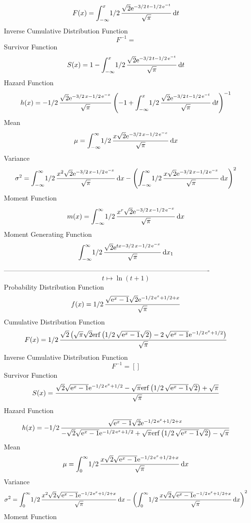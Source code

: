 \documentclass[12pt]{article}
\begin{document}
 $$F(x)=\int_{-\infty }^{x}\!1/2\,{\frac {\sqrt {2}{{\rm e}^{-3/2\,t-1/2\,{
{\rm e}^{-t}}}}}{\sqrt {\pi}}}\,{\rm d}t
$$ Inverse Cumulative Distribution Function 
  $$F^{-1} = $$Survivor Function 
 $$ S(x)=1-\int_{-\infty }^{x}\!1/2\,{\frac {\sqrt {2}{{\rm e}^{-3/2\,t-1/2\,{
{\rm e}^{-t}}}}}{\sqrt {\pi}}}\,{\rm d}t
$$ Hazard Function 
 $$ h(x)=-1/2\,{\frac {\sqrt {2}{{\rm e}^{-3/2\,x-1/2\,{{\rm e}^{-x}}}}}{\sqrt 
{\pi}} \left( -1+\int_{-\infty }^{x}\!1/2\,{\frac {\sqrt {2}{{\rm e}^{
-3/2\,t-1/2\,{{\rm e}^{-t}}}}}{\sqrt {\pi}}}\,{\rm d}t \right) ^{-1}}
$$Mean 
 $$ \mu=\int_{-\infty }^{\infty }\!1/2\,{\frac {x\sqrt {2}{{\rm e}^{-3/2\,x-1/
2\,{{\rm e}^{-x}}}}}{\sqrt {\pi}}}\,{\rm d}x
$$ Variance 
 $$ \sigma^2 = \int_{-\infty }^{\infty }\!1/2\,{\frac {{x}^{2}\sqrt {2}{{\rm e}^{-3/2
\,x-1/2\,{{\rm e}^{-x}}}}}{\sqrt {\pi}}}\,{\rm d}x- \left( \int_{-
\infty }^{\infty }\!1/2\,{\frac {x\sqrt {2}{{\rm e}^{-3/2\,x-1/2\,{
{\rm e}^{-x}}}}}{\sqrt {\pi}}}\,{\rm d}x \right) ^{2}
$$Moment Function 
 $$ m(x) = \int_{-\infty }^{\infty }\!1/2\,{\frac {{x}^{r}\sqrt {2}{{\rm e}^{-3/2
\,x-1/2\,{{\rm e}^{-x}}}}}{\sqrt {\pi}}}\,{\rm d}x
$$ Moment Generating Function 
 $$\int_{-\infty }^{\infty }\!1/2\,{\frac {\sqrt {2}{{\rm e}^{tx-3/2\,x-1
/2\,{{\rm e}^{-x}}}}}{\sqrt {\pi}}}\,{\rm d}x_{{1}}
$$-------------------------------------------------------------------------------------------  \\$$t\mapsto \ln  \left( t+1 \right) 
$$Probability Distribution Function 
$$  f(x)=1/2\,{\frac {\sqrt {{{\rm e}^{x}}-1}\sqrt {2}{{\rm e}^{-1/2\,{{\rm e}^
{x}}+1/2+x}}}{\sqrt {\pi}}}
$$Cumulative Distribution Function  
 $$F(x)=1/2\,{\frac {\sqrt {2} \left( \sqrt {\pi}\sqrt {2}{\rm erf} \left(1/2
\,\sqrt {{{\rm e}^{x}}-1}\sqrt {2}\right)-2\,\sqrt {{{\rm e}^{x}}-1}{
{\rm e}^{-1/2\,{{\rm e}^{x}}+1/2}} \right) }{\sqrt {\pi}}}
$$ Inverse Cumulative Distribution Function 
  $$F^{-1} = []
$$Survivor Function 
 $$ S(x)={\frac {\sqrt {2}\sqrt {{{\rm e}^{x}}-1}{{\rm e}^{-1/2\,{{\rm e}^{x}}+
1/2}}-\sqrt {\pi}{\rm erf} \left(1/2\,\sqrt {{{\rm e}^{x}}-1}\sqrt {2}
\right)+\sqrt {\pi}}{\sqrt {\pi}}}
$$ Hazard Function 
 $$ h(x)=-1/2\,{\frac {\sqrt {{{\rm e}^{x}}-1}\sqrt {2}{{\rm e}^{-1/2\,{{\rm e}
^{x}}+1/2+x}}}{-\sqrt {2}\sqrt {{{\rm e}^{x}}-1}{{\rm e}^{-1/2\,{
{\rm e}^{x}}+1/2}}+\sqrt {\pi}{\rm erf} \left(1/2\,\sqrt {{{\rm e}^{x}
}-1}\sqrt {2}\right)-\sqrt {\pi}}}
$$Mean 
 $$ \mu=\int_{0}^{\infty }\!1/2\,{\frac {x\sqrt {2}\sqrt {{{\rm e}^{x}}-1}{
{\rm e}^{-1/2\,{{\rm e}^{x}}+1/2+x}}}{\sqrt {\pi}}}\,{\rm d}x
$$ Variance 
 $$ \sigma^2 = \int_{0}^{\infty }\!1/2\,{\frac {{x}^{2}\sqrt {2}\sqrt {{{\rm e}^{x}}-
1}{{\rm e}^{-1/2\,{{\rm e}^{x}}+1/2+x}}}{\sqrt {\pi}}}\,{\rm d}x-
 \left( \int_{0}^{\infty }\!1/2\,{\frac {x\sqrt {2}\sqrt {{{\rm e}^{x}
}-1}{{\rm e}^{-1/2\,{{\rm e}^{x}}+1/2+x}}}{\sqrt {\pi}}}\,{\rm d}x
 \right) ^{2}
$$Moment Function 
\end{document}
